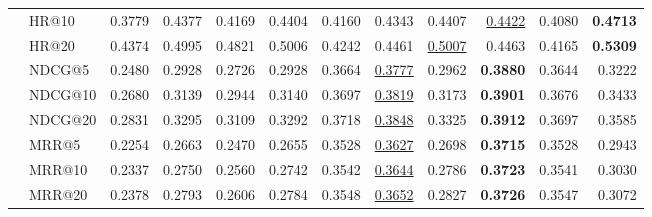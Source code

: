 \begin{tabular}{llrrrrrrrrrr}
 & HR@10 & 0.3779 & 0.4377 & 0.4169 & 0.4404 & 0.4160 & 0.4343 & 0.4407 & \underline{0.4422} & 0.4080 & \textbf{0.4713} \\
 & HR@20 & 0.4374 & 0.4995 & 0.4821 & 0.5006 & 0.4242 & 0.4461 & \underline{0.5007} & 0.4463 & 0.4165 & \textbf{0.5309} \\
 & NDCG@5 & 0.2480 & 0.2928 & 0.2726 & 0.2928 & 0.3664 & \underline{0.3777} & 0.2962 & \textbf{0.3880} & 0.3644 & 0.3222 \\
 & NDCG@10 & 0.2680 & 0.3139 & 0.2944 & 0.3140 & 0.3697 & \underline{0.3819} & 0.3173 & \textbf{0.3901} & 0.3676 & 0.3433 \\
 & NDCG@20 & 0.2831 & 0.3295 & 0.3109 & 0.3292 & 0.3718 & \underline{0.3848} & 0.3325 & \textbf{0.3912} & 0.3697 & 0.3585 \\
 & MRR@5 & 0.2254 & 0.2663 & 0.2470 & 0.2655 & 0.3528 & \underline{0.3627} & 0.2698 & \textbf{0.3715} & 0.3528 & 0.2943 \\
 & MRR@10 & 0.2337 & 0.2750 & 0.2560 & 0.2742 & 0.3542 & \underline{0.3644} & 0.2786 & \textbf{0.3723} & 0.3541 & 0.3030 \\
 & MRR@20 & 0.2378 & 0.2793 & 0.2606 & 0.2784 & 0.3548 & \underline{0.3652} & 0.2827 & \textbf{0.3726} & 0.3547 & 0.3072 \\
\hline
\end{tabular}
